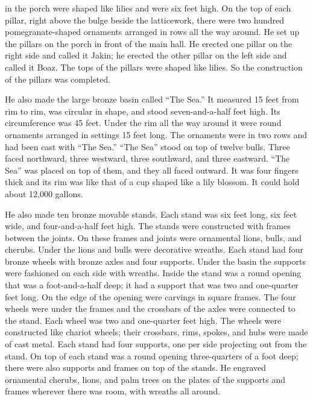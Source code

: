 {in the porch
were shaped
like lilies
and were six feet high.
On
the top
of each
pillar,
right
above
the bulge
beside
the latticework,
there were two hundred
pomegranate-shaped
ornaments
arranged in rows
all the way around.
He set up
the pillars
on the porch
in front of the main hall.
He erected
one pillar
on the right
side and called
it Jakin;
he erected
the other pillar
on the left
side and called
it Boaz.
The tops
of the pillars
were shaped
like lilies.
So the construction
of the pillars
was completed.
\par }{\PP {}He also made
the large bronze basin
called “The Sea.”
It measured 15 feet
from rim
to
rim,
was circular
in shape,
and stood seven-and-a-half feet
high.
Its circumference
was 45 feet.
Under
the rim
all the way around
it were round
ornaments
arranged in settings
15 feet
long. The ornaments
were in two
rows
and had been cast
with “The Sea.”
“The Sea” stood
on
top
of twelve
bulls.
Three
faced
northward,
three
westward,
three
southward,
and three
eastward.
“The Sea”
was placed
on
top
of them, and they all
faced outward.
It was four fingers
thick
and its rim
was like that
of a cup
shaped
like a lily
blossom.
It could hold
about 12,000 gallons.
\par }{\PP {}He also made
ten
bronze
movable stands.
Each stand
was six feet
long,
six feet
wide,
and four-and-a-half feet
high.
The stands
were constructed
with frames
between
the joints.
On
these frames
and joints
were ornamental lions,
bulls,
and cherubs.
Under
the lions
and bulls
were decorative
wreaths.
Each
stand
had four
bronze
wheels
with bronze
axles
and four
supports.
Under
the basin
the supports
were fashioned
on each
side
with wreaths.
Inside
the stand
was a round opening
that was a foot-and-a-half deep;
it had a support
that was two and one-quarter feet long.
On the edge
of the opening
were carvings
in square
frames.
The four
wheels
were under
the frames
and the crossbars
of the axles
were connected to the stand.
Each wheel
was two and one-quarter feet
high.
The wheels
were constructed
like chariot
wheels;
their crossbars,
rims,
spokes,
and hubs
were made of cast metal.
Each
stand
had four
supports,
one
per side
projecting out
from the stand.
On top
of each stand
was a round
opening three-quarters of a foot
deep;
there were also supports
and frames
on
top
of the stands.
He engraved
ornamental cherubs,
lions,
and palm trees
on
the plates
of the supports
and frames
wherever there was room,
with wreaths
all around.
}
